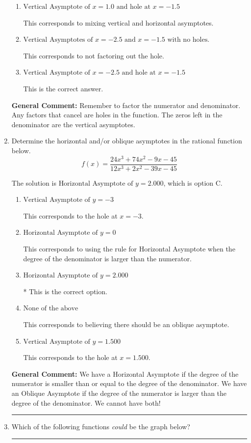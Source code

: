 \documentclass{extbook}[14pt]
\newcommand{\litem}[1]{\item #1

\rule{\textwidth}{0.4pt}}
\begin{document}
\begin{enumerate}
{\begin{enumerate}[label=\Alph*.]
This corresponds to setting the numerator equal to 0.
\item \( \text{Vertical Asymptote of } x = 1.0 \text{ and hole at } x = -1.5 \)

This corresponds to mixing vertical and horizontal asymptotes.
\item \( \text{Vertical Asymptotes of } x = -2.5 \text{ and } x = -1.5 \text{ with no holes.} \)

This corresponds to not factoring out the hole.
\item \( \text{Vertical Asymptote of } x = -2.5 \text{ and hole at } x = -1.5 \)

This is the correct answer.
\end{enumerate}

\textbf{General Comment:} Remember to factor the numerator and denominator. Any factors that cancel are holes in the function. The zeros left in the denominator are the vertical asymptotes.
}
\litem{
Determine the horizontal and/or oblique asymptotes in the rational function below.
\[ f(x) = \frac{24x^{3} +74 x^{2} -9 x -45}{12x^{3} +2 x^{2} -39 x -45} \]

The solution is \( \text{Horizontal Asymptote of } y = 2.000  \), which is option C.\begin{enumerate}[label=\Alph*.]
\item \( \text{Vertical Asymptote of } y = -3  \)

This corresponds to the hole at $x = -3$.
\item \( \text{Horizontal Asymptote of } y = 0  \)

This corresponds to using the rule for Horizontal Asymptote when the degree of the denominator is larger than the numerator.
\item \( \text{Horizontal Asymptote of } y = 2.000  \)

* This is the correct option.
\item \( \text{None of the above} \)

This corresponds to believing there should be an oblique asymptote.
\item \( \text{Vertical Asymptote of } y = 1.500  \)

This corresponds to the hole at $x = 1.500$.
\end{enumerate}

\textbf{General Comment:} We have a Horizontal Asymptote if the degree of the numerator is smaller than or equal to the degree of the denominator. We have an Oblique Asymptote if the degree of the numerator is larger than the degree of the denominator. We cannot have both!
}
\litem{
Which of the following functions \textit{could} be the graph below?

}
\end{enumerate}
\end{document}
